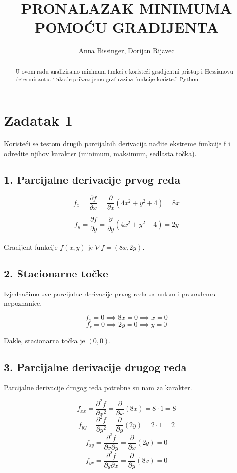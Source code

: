 \documentclass{article}
\title{PRONALAZAK MINIMUMA POMOĆU GRADIJENTA}
\author{Anna Bissinger, Dorijan Rijavec}
\date{}
\begin{document}
\maketitle

\begin{abstract}
U ovom radu analiziramo minimum funkcije koristeći gradijentni pristup i Hessianovu determinantu. Takođe prikazujemo graf razina funkcije koristeći Python.
\end{abstract}

\section{Zadatak 1}

Koristeći se testom drugih parcijalnih derivacija nađite ekstreme funkcije
f i odredite njihov karakter (minimum, maksimum, sedlasta točka). 

\subsection*{1. Parcijalne derivacije prvog reda}

\[
f_x = \frac{\partial f}{\partial x} = \frac{\partial}{\partial x} (4x^2 + y^2 + 4) = 8x
\]

\[
f_y = \frac{\partial f}{\partial y} = \frac{\partial}{\partial y} (4x^2 + y^2 + 4) = 2y
\]
\\
Gradijent funkcije \( f(x, y) \) je \( \nabla f = (8x, 2y) \).

\subsection*{2. Stacionarne točke}

Izjednačimo sve parcijalne derivacije prvog reda sa nulom i pronađemo nepoznanice.

\[
f_x = 0 \implies 8x = 0 \implies x = 0
\]
\[
f_y = 0 \implies 2y = 0 \implies y = 0
\]

Dakle, stacionarna točka je \((0, 0)\).

\subsection*{3. Parcijalne derivacije drugog reda}

Parcijalne derivacije drugog reda potrebne su nam za karakter.

\[
f_{xx} = \frac{\partial^2 f}{\partial x^2} = \frac{\partial}{\partial x} (8x) = 8 \cdot 1 = 8
\]
\[
f_{yy} = \frac{\partial^2 f}{\partial y^2} = \frac{\partial}{\partial y} (2y) = 2 \cdot 1 = 2
\]
\[
f_{xy} = \frac{\partial^2 f}{\partial x \partial y} = \frac{\partial}{\partial x} (2y) = 0
\]
\[
f_{yx} = \frac{\partial^2 f}{\partial y \partial x} = \frac{\partial}{\partial y} (8x) = 0
\]
\end{document}
